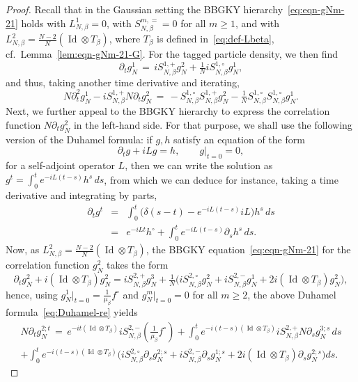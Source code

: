 \documentclass[10pt,a4paper]{amsart}
\newcommand{\Id}{\operatorname{Id}}
\begin{document}
\begin{proof}
Recall that in the Gaussian setting the BBGKY hierarchy~\eqref{eq:eqn-gNm-21} holds with $L_{N,\beta}^1=0$, with $S_{N,\beta}^{m,=}=0$ for all $m\ge1$, and with $L_{N,\beta}^2=\frac{N-2}N(\Id\otimes T_\beta)$, where $T_\beta$ is defined in~\eqref{eq:def-Lbeta}, cf.~Lemma~\ref{lem:eqn-gNm-21-G}.
For the tagged particle density, we then find
\begin{equation}\label{eq:dt1g1}
\partial_tg_N^1\,=\,iS_{N,\beta}^{1,+}g_N^2+\tfrac1NiS_{N,\beta}^{1,\circ}g_N^1,
\end{equation}
and thus, taking another time derivative and iterating,
\begin{equation}\label{eq:dt2g1}
N\partial_t^2g_N^1-iS_{N,\beta}^{1,+}N\partial_tg_N^2\,=\,-S_{N,\beta}^{1,\circ}S_{N,\beta}^{1,+}g_N^2-\tfrac1{N}S_{N,\beta}^{1,\circ}S_{N,\beta}^{1,\circ}g_N^1.
\end{equation}
Next, we further appeal to the BBGKY hierarchy to express the correlation function $N\partial_tg_N^2$ in the left-hand side. For that purpose, we shall use the following version of the Duhamel formula: if $g,h$ satisfy an equation of the form
\[\partial_tg+iLg=h,\qquad g|_{t=0}=0,\]
for a self-adjoint operator $L$, then we can write the solution as $g^t=\int_0^te^{-iL(t-s)}h^s\,ds$, from which we can deduce for instance, taking a time derivative and integrating by parts,
\begin{eqnarray}
\partial_tg^t&=&\int_0^t\big(\delta(s-t)-e^{-iL(t-s)}iL\big)h^s\,ds\nonumber\\
&=&e^{-iLt}h^\circ+\int_0^te^{-iL(t-s)}\partial_sh^s\,ds.\label{eq:Duhamel-re}
\end{eqnarray}
Now, as $L^2_{N,\beta}=\frac{N-2}N(\Id\otimes T_\beta)$, the BBGKY equation~\eqref{eq:eqn-gNm-21} for the correlation function $g_N^2$ takes the form
\[\partial_tg^2_N+i(\Id\otimes T_\beta)g^2_N=iS^{2,+}_{N,\beta}g_N^3+\tfrac1N\Big(iS^{2,\circ}_{N,\beta}g_N^2+iS_{N,\beta}^{2,-}g^1_N+2i(\Id\otimes T_\beta)g_N^2\Big),\]
hence, using $g_N^1|_{t=0}=\tfrac1{\mu_\beta}f^\circ$ and $g_N^m|_{t=0}=0$ for all $m\ge2$, the above Duhamel formula~\eqref{eq:Duhamel-re} yields
\begin{multline*}
N\partial_tg_N^{2;t}\,=\,e^{-it(\Id\otimes T_\beta)}iS_{N,\beta}^{2,-}(\tfrac1{\mu_\beta}f^\circ)
+\int_0^te^{-i(t-s)(\Id\otimes T_\beta)}iS_{N,\beta}^{2,+}N\partial_sg_N^{3;s}\,ds\\
+\int_0^te^{-i(t-s)(\Id\otimes T_\beta)}\Big(iS_{N,\beta}^{2,\circ}\partial_sg_N^{2;s}+iS_{N,\beta}^{2,-}\partial_sg_N^{1;s}+2i(\Id\otimes T_\beta)\partial_sg_N^{2;s}\Big)ds.

\end{multline*}
\end{proof}
\end{document}
